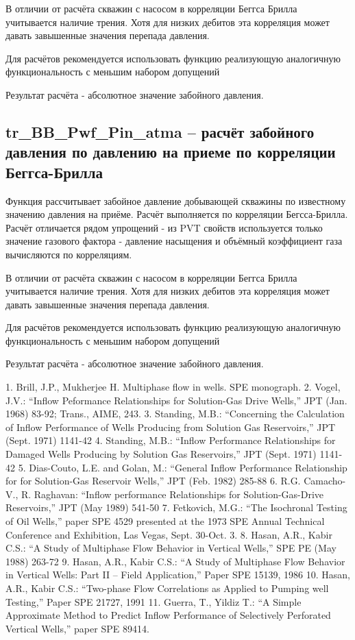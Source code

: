 \documentclass[]{scrreprt}
\begin{document}
В отличии от расчёта скважин с насосом в корреляции Беггса Брилла учитывается наличие трения. Хотя для низких дебитов эта корреляция может давать завышенные значения перепада давления. 

Для расчётов рекомендуется использовать функцию \unf реализующую аналогичную функциональность с меньшим набором допущений

Результат расчёта - абсолютное значение забойного давления. 

\subsection{tr\_BB\_Pwf\_Pin\_atma – расчёт забойного давления по давлению на приеме по корреляции Беггса-Брилла}
Функция рассчитывает забойное давление  добывающей скважины по известному значению давления на приёме. Расчёт выполняется по корреляции Бегсса-Брилла. 
Расчёт отличается рядом упрощений - из PVT свойств используется только значение газового фактора - давление насыщения и объёмный коэффициент газа вычисляются по корреляциям. 

В отличии от расчёта скважин с насосом в корреляции Беггса Брилла учитывается наличие трения. Хотя для низких дебитов эта корреляция может давать завышенные значения перепада давления. 

Для расчётов рекомендуется использовать функцию \unf реализующую аналогичную функциональность с меньшим набором допущений

Результат расчёта - абсолютное значение забойного давления. 


\cite{HasanKabir_HeatTransfer_2002}

{}



1.	Brill, J.P., Mukherjee H. Multiphase flow in wells. SPE monograph.
2.	Vogel, J.V.: “Inflow Peformance Relationships for Solution-Gas Drive Wells,” JPT (Jan. 1968) 83-92; Trans., AIME, 243.
3.	Standing, M.B.: “Concerning the Calculation of Inflow Performance of Wells Producing from Solution Gas Reservoirs,” JPT (Sept. 1971) 1141-42
4.	Standing, M.B.: “Inflow Performance Relationships for Damaged Wells Producing by Solution Gas Reservoirs,” JPT (Sept. 1971) 1141-42
5.	Dias-Couto, L.E. and Golan, M.: “General Inflow Performance Relationship for for Solution-Gas Reservoir Wells,” JPT (Feb. 1982) 285-88
6.	R.G. Camacho-V., R. Raghavan: “Inflow performance Relationships for Solution-Gas-Drive Reservoirs,”  JPT (May 1989) 541-50
7.	Fetkovich, M.G.: “The Isochronal Testing of Oil Wells,” paper SPE 4529 presented at the 1973 SPE Annual Technical  Conference and Exhibition, Las Vegas, Sept. 30-Oct. 3.
8.	Hasan, A.R., Kabir C.S.: “A Study of Multiphase Flow Behavior in Vertical Wells,” SPE PE (May 1988) 263-72
9.	Hasan, A.R., Kabir C.S.: “A Study of Multiphase Flow Behavior in Vertical Wells: Part II – Field Application,” Paper SPE 15139, 1986
10.	Hasan, A.R., Kabir C.S.: “Two-phase Flow Correlations as Applied to Pumping well Testing,” Paper SPE 21727, 1991
11.	 Guerra, T., Yildiz T.: “A Simple Approximate Method to Predict Inflow Performance of Selectively Perforated Vertical Wells,” paper SPE 89414.
\end{document}
